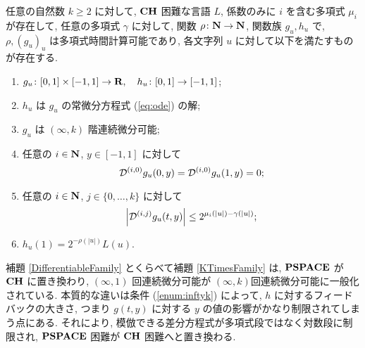  \begin{lemma}
  \label{KTimesFamily}
  任意の自然数 $k \ge 2$ に対して,
  $\mathbf{CH}$ 困難な言語 $L$,
  係数のみに $i$ を含む多項式 $\mu_i$ が存在して,
  任意の多項式 $\gamma$ に対して,
  関数 $\rho \colon \mathbf N \to \mathbf N$, 関数族 $g_u, h_u$ で,
  $\rho, (g_u)_u$ は多項式時間計算可能であり,
  各文字列 $u$ に対して以下を満たすものが存在する.
  \begin{enumerate}
   \item $g_u\colon [0,1] \times [-1,1]\to \mathbf R, \quad h_u\colon [0,1] \to [-1,1]$;
   \item $h_u$ は $g_u$ の常微分方程式 (\ref{eq:ode}) の解;
   \item $g_u$ は $(\infty, k)$ 階連続微分可能;
   \item 任意の $i \in \mathbf N$, $y \in [-1,1]$ に対して
	 \begin{equation*}
	  \mathcal D^{(i, 0)} g_u(0,y) = \mathcal D^{(i, 0)} g_u(1,y) = 0 ;
	 \end{equation*}
   \item \label{enum:inftyk}
	 任意の $i \in \mathbf N$, $j \in \{0, \dots, k\}$ に対して
	 \begin{equation*}
	  \left|\mathcal D^{(i,j)} g_u(t,y)\right| \le 2^{\mu_i(|u|) - \gamma(|u|)};
	 \end{equation*}
   \item $h_u(1) = 2^{-\rho(|u|)}L(u)$.
  \end{enumerate}
 \end{lemma}


補題 \ref{DifferentiableFamily} とくらべて補題 \ref{KTimesFamily} は,
$\mathbf{PSPACE}$ が $\mathbf{CH}$ に置き換わり, $(\infty, 1)$ 回連続微分可能が 
$(\infty, k)$回連続微分可能に一般化されている.
本質的な違いは条件 (\ref{enum:inftyk}) によって, $h$ に対するフィードバックの大きさ,
つまり $g(t,y)$ に対する $y$ の値の影響がかなり制限されてしまう点にある.
それにより, 模倣できる差分方程式が多項式段ではなく対数段に制限され,
$\mathbf{PSPACE}$ 困難が $\mathbf{CH}$ 困難へと置き換わる.



